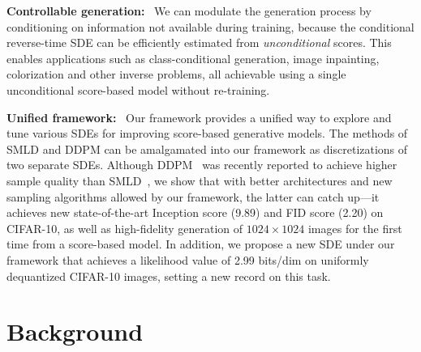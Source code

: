 \documentclass{article} %
\begin{document}
\textbf{Controllable generation:}~ We can modulate the generation process by conditioning on information not available during training, because the conditional reverse-time SDE can be efficiently estimated from \emph{unconditional} scores. This enables applications such as class-conditional generation, image inpainting, colorization and other inverse problems, all achievable using a single unconditional score-based model without re-training.


\textbf{Unified framework:}~ Our framework provides a unified way to explore and tune various SDEs for improving score-based generative models.
The methods of SMLD and DDPM can be amalgamated into our framework as discretizations of two separate SDEs. 
Although DDPM~\citep{ho2020denoising} was recently reported to achieve higher sample quality than SMLD~\citep{song2019generative,song2020improved}, we show that with better architectures and new sampling algorithms allowed by our framework, the latter can catch up---it achieves new state-of-the-art Inception score (9.89) and FID score (2.20) on CIFAR-10, as well as high-fidelity generation of $1024\times 1024$ images for the first time from a score-based model. In addition, we propose a new SDE under our framework that achieves a likelihood value of 2.99 bits/dim on uniformly dequantized CIFAR-10 images, setting a new record on this task.


\section{Background}
\end{document}
